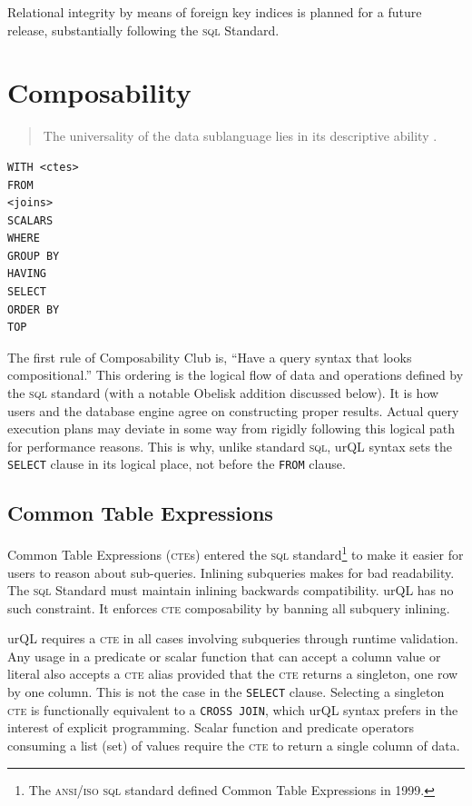 \documentclass[twoside]{article}
\begin{document}
Relational integrity by means of foreign key indices is planned for a future release, substantially following the \textsc{sql} Standard.

\section{Composability}

\begin{quote}
The universality of the data sublanguage lies in its descriptive ability \citep{Codd1970}.
\end{quote}

\begin{lstlisting}[style=listingcode_sql]
WITH <ctes>
FROM
<joins>
SCALARS
WHERE
GROUP BY
HAVING
SELECT
ORDER BY
TOP
\end{lstlisting}

The first rule of Composability Club is, ``Have a query syntax that looks compositional.''  This ordering is the logical flow of data and operations defined by the \textsc{sql} standard (with a notable Obelisk addition discussed below). It is how users and the database engine agree on constructing proper results. Actual query execution plans may deviate in some way from rigidly following this logical path for performance reasons. This is why, unlike standard \textsc{sql}, urQL syntax sets the \lstinline[style=inlinecode]{SELECT} clause in its logical place, not before the \lstinline[style=inlinecode]{FROM} clause.


\subsection{Common Table Expressions}

Common Table Expressions (\textsc{cte}s) entered the \textsc{sql} standard\footnote{The \textsc{ansi}/\textsc{iso} \textsc{sql} standard defined Common Table Expressions in 1999.} to make it easier for users to reason about sub-queries. Inlining subqueries makes for bad readability. The \textsc{sql} Standard must maintain inlining backwards compatibility. urQL has no such constraint. It enforces \textsc{cte} composability by banning all subquery inlining.

\sloppy
urQL requires a \textsc{cte} in all cases involving subqueries through runtime validation. Any usage in a predicate or scalar function that can accept a column value or literal also accepts a \textsc{cte} alias provided that the \textsc{cte} returns a singleton, one row by one column. This is not the case in the \lstinline[style=inlinecode]{SELECT} clause. Selecting a singleton \textsc{cte} is functionally equivalent to a \lstinline[style=inlinecode]{CROSS JOIN}, which urQL syntax prefers in the interest of explicit programming. Scalar function and predicate operators consuming a list (set) of values require the \textsc{cte} to return a single column of data. 
\end{document}
